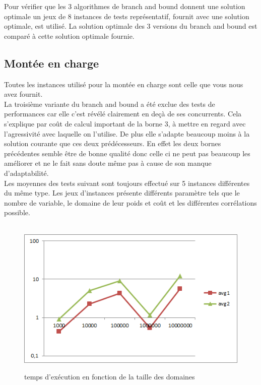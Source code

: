 \documentclass[12pt,a4paper]{article}
\begin{document}
Pour vérifier que les 3 algorithmes de branch and bound donnent une solution optimale un jeux de 8 instances de tests représentatif, fournit avec une solution optimale, est utilisé. La solution optimale des 3 versions du branch and bound est comparé à cette solution optimale fournie.\\

\subsection{Montée en charge}
Toutes les instances utilisé pour la montée en charge sont celle que vous nous avez fournit.\\

La troisième variante du branch and bound a été exclue des tests de performances car elle c'est révélé clairement en deçà de ses concurrents. Cela s'explique par coût de calcul important de la borne 3, à mettre en regard avec l'agressivité avec laquelle on l'utilise. De plus elle s'adapte beaucoup moins à la solution courante que ces deux prédécesseurs. En effet les deux bornes précédentes semble être de bonne qualité donc celle ci ne peut pas beaucoup les améliorer et ne le fait sans doute même pas à cause de son manque d'adaptabilité.\\

Les moyennes des tests suivant sont toujours effectué sur 5 instances différentes du même type. Les jeux d'instances présente différents paramètre tels que le nombre de variable, le domaine de leur poids et coût et les différentes corrélations possible.\\

~\\
\begin{figure}[h]
	\centering
	\includegraphics{./resultat/graphe_temps_selon_coef_range_(correlation_type_3_200_variables).png}
	\label{fonctrange}
	\caption{temps d’exécution en fonction de la taille des domaines}
\end{figure}
~\\
\end{document}
